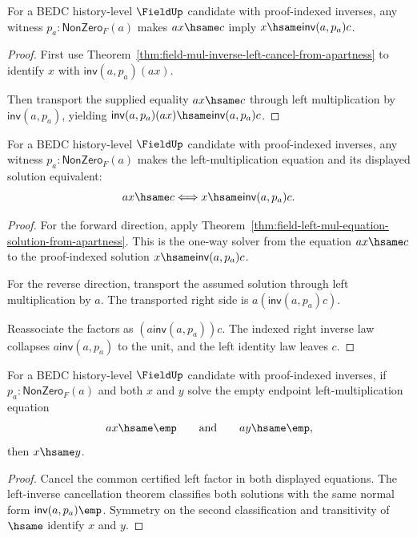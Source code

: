 \begin{theorem}
\label{thm:field-left-mul-equation-solution-from-apartness}
For a BEDC history-level $\FieldUp$ candidate with proof-indexed inverses,
any witness $p_a:\mathsf{NonZero}_F(a)$ makes $a x\hsame c$ imply
$x\hsame \mathsf{inv}(a,p_a)c$.
\end{theorem}
\begin{proof}
First use Theorem~\ref{thm:field-mul-inverse-left-cancel-from-apartness}
to identify $x$ with $\mathsf{inv}(a,p_a)(a x)$.

Then transport the supplied equality $a x\hsame c$ through left multiplication
by $\mathsf{inv}(a,p_a)$, yielding
$\mathsf{inv}(a,p_a)(a x)\hsame \mathsf{inv}(a,p_a)c$.
\end{proof}

\begin{theorem}
\label{thm:field-left-mul-equation-exact-from-apartness}
For a BEDC history-level $\FieldUp$ candidate with proof-indexed inverses,
any witness $p_a:\mathsf{NonZero}_F(a)$ makes the left-multiplication
equation and its displayed solution equivalent:
$$
a x\hsame c
\Longleftrightarrow
x\hsame \mathsf{inv}(a,p_a)c.
$$
\end{theorem}
\begin{proof}
For the forward direction, apply
Theorem~\ref{thm:field-left-mul-equation-solution-from-apartness}. This is
the one-way solver from the equation $a x\hsame c$ to the proof-indexed
solution $x\hsame \mathsf{inv}(a,p_a)c$.

For the reverse direction, transport the assumed solution through left
multiplication by $a$. The transported right side is
$a(\mathsf{inv}(a,p_a)c)$.

Reassociate the factors as $(a\mathsf{inv}(a,p_a))c$. The indexed right
inverse law collapses $a\mathsf{inv}(a,p_a)$ to the unit, and the left
identity law leaves $c$.
\end{proof}

\begin{theorem}
\label{thm:field-left-mul-empty-equation-solution-unique-from-apartness}
For a BEDC history-level $\FieldUp$ candidate with proof-indexed inverses, if
$p_a:\mathsf{NonZero}_F(a)$ and both $x$ and $y$ solve the empty endpoint
left-multiplication equation
$$
a x\hsame \emp
\qquad\text{and}\qquad
a y\hsame \emp,
$$
then $x\hsame y$.
\end{theorem}
\begin{proof}
Cancel the common certified left factor in both displayed equations. The
left-inverse cancellation theorem classifies both solutions with the same
normal form $\mathsf{inv}(a,p_a)\emp$. Symmetry on the second classification
and transitivity of $\hsame$ identify $x$ and $y$.
\end{proof}

